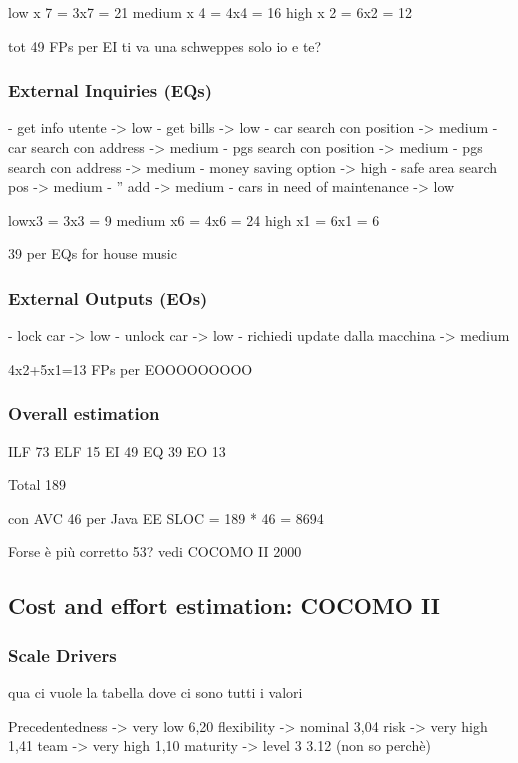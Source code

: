 \documentclass[english]{article}
\begin{document}
low x 7 = 3x7 = 21
medium x 4 = 4x4 = 16
high x 2 = 6x2 = 12

tot 49 FPs per EI ti va una schweppes solo io e te?


\subsubsection{External Inquiries (EQs)}

- get info utente -> low
- get bills -> low
- car search con position -> medium
- car search con address -> medium
- pgs search con position -> medium
- pgs search con address -> medium
- money saving option -> high
- safe area search pos -> medium
- '' add -> medium
- cars in need of maintenance -> low

lowx3 = 3x3 = 9
medium x6 = 4x6 = 24
high x1 = 6x1 = 6

39 per EQs for house music

\subsubsection{External Outputs (EOs)}

- lock car -> low
- unlock car -> low
- richiedi update dalla macchina -> medium

4x2+5x1=13 FPs per EOOOOOOOOO

\subsubsection{Overall estimation}

ILF 73
ELF 15
EI 49
EQ 39
EO 13

Total 189

con AVC 46 per Java EE
SLOC = 189 * 46 = 8694

Forse è più corretto 53? vedi COCOMO II 2000


\subsection{Cost and effort estimation: COCOMO II}


\subsubsection{Scale Drivers}

qua ci vuole la tabella dove ci sono tutti i valori

Precedentedness -> very low 6,20
flexibility -> nominal 3,04
risk -> very high 1,41
team -> very high 1,10
maturity -> level 3 3.12 (non so perchè)
\end{document}
